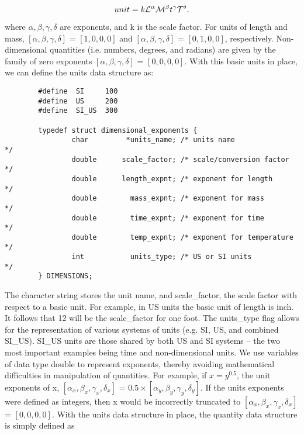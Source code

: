  \[ unit =  k {\cal L}^\alpha {\cal M}^\beta t^\gamma {\cal T}^\delta. \]

\vspace{0.15 in}\noindent
where $\alpha, \beta, \gamma, \delta $ are exponents,
and k is the scale factor.
For units of length and mass,
$[\alpha, \beta, \gamma, \delta ]$ = $[1, 0, 0, 0] $ and
$[\alpha, \beta, \gamma, \delta ]$ = $[0, 1, 0, 0] $, respectively.
Non-dimensional quantities (i.e. numbers, degrees, and radians) are given by the
family of zero exponents $[\alpha, \beta, \gamma, \delta ]$ = $[0, 0, 0, 0]$.
With this basic units in place,
we can define the units data structure as:

\begin{footnotesize}
\begin{verbatim}
        #define  SI     100
        #define  US     200
        #define  SI_US  300

        typedef struct dimensional_exponents {
                char         *units_name; /* units name               */
                double      scale_factor; /* scale/conversion factor  */
                double      length_expnt; /* exponent for length      */
                double        mass_expnt; /* exponent for mass        */
                double        time_expnt; /* exponent for time        */
                double        temp_expnt; /* exponent for temperature */
                int           units_type; /* US or SI units           */
        } DIMENSIONS;
\end{verbatim}
\end{footnotesize}

\vspace{0.15 in}\noindent
The character string stores the unit name,
and scale\_factor, the scale factor with respect to a basic unit.
For example, in US units the basic unit of length is inch.
It follows that 12 will be the scale\_factor for one foot.
The units\_type flag allows for the representation of
various systems of units (e.g. SI, US, and combined SI\_US).
SI\_US units are those shared by both US and SI systems -- the
two most important examples being time and non-dimensional units.
We use variables of data type double to represent exponents,
thereby avoiding mathematical difficulties in manipulation
of quantities. For example, if $ x = y ^{0.5}$,
the unit exponents of x,  $[\alpha_x, \beta_x, \gamma_x, \delta_x ]$ = 
$0.5 \times [\alpha_y, \beta_y, \gamma_y, \delta_y]$.
If the units exponents were defined as integers,
then x would be incorrectly truncated to
$[\alpha_x, \beta_x, \gamma_x, \delta_x ]$ = $[0, 0, 0, 0]$.
With the units data structure in place,
the quantity data structure is simply defined as

